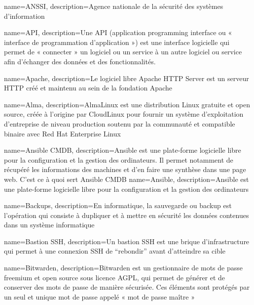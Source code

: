 {
    name=ANSSI,
    description={Agence nationale de la sécurité des systèmes d'information}
}

{
    name=API,
    description={Une API (application programming interface ou « interface de programmation d'application ») est une interface logicielle qui permet de « connecter » un logiciel ou un service à un autre logiciel ou service afin d'échanger des données et des fonctionnalités.}
}

{
    name=Apache,
    description={Le logiciel libre Apache HTTP Server est un serveur HTTP créé et maintenu au sein de la fondation Apache}
}

{
    name=Alma,
    description={AlmaLinux est une distribution Linux gratuite et open source, créée à l'origine par CloudLinux pour fournir un système d'exploitation d'entreprise de niveau production soutenu par la communauté et compatible binaire avec Red Hat Enterprise Linux}
}

{
    name=Ansible CMDB,
    description={Ansible est une plate-forme logicielle libre pour la configuration et la gestion des ordinateurs. Il permet notamment de récupéré les informations des machines et d'en faire une synthèse dans une page web. C'est ce à quoi sert Ansible CMDB}
}
{
    name=Ansible,
    description={Ansible est une plate-forme logicielle libre pour la configuration et la gestion des ordinateurs}
}

{
    name=Backups,
    description={En informatique, la sauvegarde ou backup est l'opération qui consiste à dupliquer et à mettre en sécurité les données contenues dans un système informatique}
}

{
    name=Bastion SSH,
    description={Un bastion SSH est une brique d'infrastructure qui permet à une connexion SSH de “rebondir” avant d'atteindre sa cible}
}

{
    name=Bitwarden,
    description={Bitwarden est un gestionnaire de mots de passe freemium et open source sous licence AGPL, qui permet de générer et de conserver des mots de passe de manière sécurisée. Ces éléments sont protégés par un seul et unique mot de passe appelé « mot de passe maître »}
}

